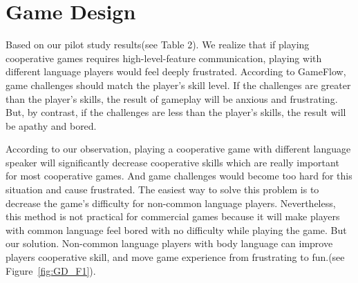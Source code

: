 \section{Game Design}


Based on our pilot study results(see Table 2). We realize that if playing cooperative games requires high-level-feature communication, playing with different language players would feel deeply frustrated. According to GameFlow\cite{GD1}, game challenges should match the player's skill level. If the challenges are greater than the player's skills, the result of gameplay will be anxious and frustrating. But, by contrast, if the challenges are less than the player's skills, the result will be apathy and bored.


According to our observation, playing a cooperative game with different language speaker will significantly decrease cooperative skills which are really important for most cooperative games. And game challenges would become too hard for this situation and cause frustrated. The easiest way to solve this problem is to decrease the game's difficulty for non-common language players. Nevertheless, this method is not practical for commercial games because it will make players with common language feel bored with no difficulty while playing the game. But our solution. Non-common language players with body language can improve players cooperative skill, and move game experience from frustrating to fun.(see Figure~\ref{fig:GD_F1}).  

